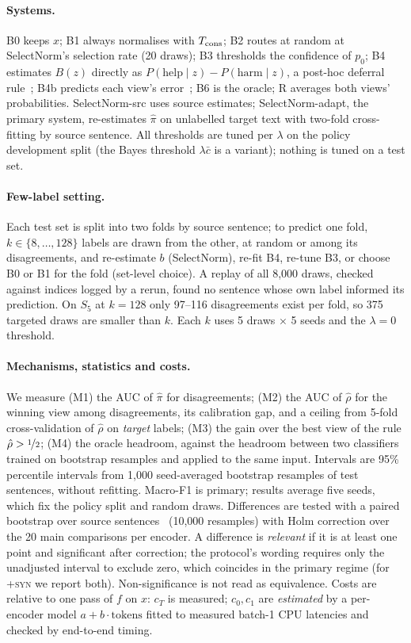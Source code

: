 \paragraph{Systems.}
B0 keeps $x$; B1 always normalises with $T_{\rm cons}$; B2 routes at random at SelectNorm's selection rate (20 draws); B3 thresholds the confidence of $p_0$; B4 estimates $B(z)$ directly as $P(\text{help}\mid z)-P(\text{harm}\mid z)$, a post-hoc deferral rule~\cite{jitkrittum2023cascade}; B4b predicts each view's error~\cite{kim2020learningloss}; B6 is the oracle; R averages both views' probabilities. SelectNorm-src uses source estimates; SelectNorm-adapt, the primary system, re-estimates $\hat\pi$ on unlabelled target text with two-fold cross-fitting by source sentence. All thresholds are tuned per $\lambda$ on the policy development split (the Bayes threshold $\lambda\bar c$ is a variant); nothing is tuned on a test set.

\paragraph{Few-label setting.}
Each test set is split into two folds by source sentence; to predict one fold, $k\in\{8,\ldots,128\}$ labels are drawn from the other, at random or among its disagreements, and re-estimate $b$ (SelectNorm), re-fit B4, re-tune B3, or choose B0 or B1 for the fold (set-level choice). A replay of all 8{,}000 draws, checked against indices logged by a rerun, found no sentence whose own label informed its prediction. On $S_5$ at $k{=}128$ only 97--116 disagreements exist per fold, so 375 targeted draws are smaller than $k$. Each $k$ uses 5 draws $\times$ 5 seeds and the $\lambda=0$ threshold.

\paragraph{Mechanisms, statistics and costs.}
We measure (M1) the AUC of $\hat\pi$ for disagreements; (M2) the AUC of $\hat\rho$ for the winning view among disagreements, its calibration gap, and a ceiling from 5-fold cross-validation of $\hat\rho$ on \emph{target} labels; (M3) the gain over the best view of the rule $\hat\rho>\nicefrac12$; (M4) the oracle headroom, against the headroom between two classifiers trained on bootstrap resamples and applied to the same input. Intervals are 95\% percentile intervals from 1{,}000 seed-averaged bootstrap resamples of test sentences, without refitting. Macro-F1 is primary; results average five seeds, which fix the policy split and random draws. Differences are tested with a paired bootstrap over source sentences~\cite{koehn2004bootstrap,dror2018hitchhiker} (10{,}000 resamples) with Holm correction over the 20 main comparisons per encoder. A difference is \emph{relevant} if it is at least one point and significant after correction; the protocol's wording requires only the unadjusted interval to exclude zero, which coincides in the primary regime (for \textsc{+syn} we report both). Non-significance is not read as equivalence. Costs are relative to one pass of $f$ on $x$: $c_T$ is measured; $c_0,c_1$ are \emph{estimated} by a per-encoder model $a+b\cdot\text{tokens}$ fitted to measured batch-1 CPU latencies and checked by end-to-end timing.

